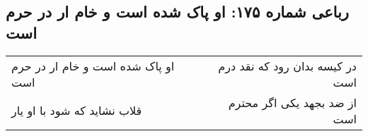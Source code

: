 \begin{center}
\section*{رباعی شماره ۱۷۵: او پاک شده است و خام ار در حرم است}
\label{sec:0175}
\begin{longtable}{l p{0.5cm} r}
او پاک شده است و خام ار در حرم است
&&
در کیسه بدان رود که نقد درم است
\\
قلاب نشاید که شود با او یار
&&
از ضد بجهد یکی اگر محترم است
\\
\end{longtable}
\end{center}
